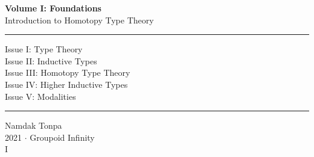 \documentclass{article}
\begin{document}
\begin{titlepage}
    \centering
    \vspace*{0.5in}
    \Huge
    \textbf{Volume I: Foundations} \\
    \LARGE
    Introduction to Homotopy Type Theory \\
    \vspace{1.5in}
    \rule{\textwidth}{0.4pt}
    \flushleft
    \small
    Issue I: Type Theory \\
    Issue II: Inductive Types \\
    Issue III: Homotopy Type Theory \\
    Issue IV: Higher Inductive Types \\
    Issue V: Modalities \\
    \rule{\textwidth}{0.4pt}
    \centering
    \vfill
    \large
    Namdak Tonpa \\
    \Large
    2021 $\cdot$ Groupoid Infinity \\
    I
\end{titlepage}

\tableofcontents
\newif\ifincludeTOC
\includeTOCfalse

\newpage \begin{standalone}  \end{standalone}        %
\newpage \begin{standalone}  \end{standalone}         %
\newpage \begin{standalone}  \end{standalone}        %
\newpage \begin{standalone}  \end{standalone}         %
\end{document}
